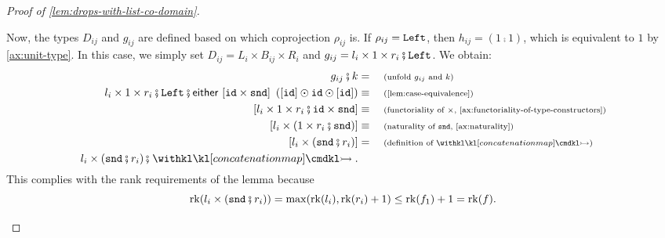 \begin{proof}[Proof of \cref{lem:drops-with-list-co-domain}]
\begin{description}
\begin{description}
			Now, the types $D_{ij}$ and $g_{ij}$ are defined based on which coprojection $\rho_{ij}$ is. If $\rho_{ij} = \mathtt{Left}$, then $h_{ij} = (1 \comp 1)$, which is equivalent to $1$ by \cref{ax:unit-type}. In this case, we simply set $D_{ij} = L_i \times B_{ij} \times R_i$ and $g_{ij} = l_i \times 1 \times r_i \comp \leftterm$. We obtain:
			\begin{align*}
				g_{i j} \comp k &= \why{unfold $g_{i j}$ and $k$} \\ 
				l_i \times 1 \times r_i \comp \leftterm \comp \either{ [\idterm \times \sndterm]}{\left( [\idterm] \odot \idterm \odot [\idterm] \right)} \equalbecause{\cref{lem:case-equivalence}} \\ 
				\left[ l_i \times 1 \times r_i \comp \idterm \times \sndterm \right] \equalbecause{functoriality of $\times$, \cref{ax:functoriality-of-type-constructors}} \\
				\left[ l_i \times \left( 1 \times r_i \comp \sndterm \right) \right] \equalbecause{naturality of $\sndterm$, \cref{ax:naturality}} \\
				\left[ l_i \times \left( \sndterm \comp r_i \right) \right] &= \why{definition of $\concmap$} \\ 
				l_i \times \left( \sndterm \comp r_i \right) \comp \concmap.
			\end{align*} 
			This complies with the rank requirements of the lemma because 
			\[ 
				\rk(l_i \times (\sndterm \comp r_i)) = \max(\rk(l_i), \rk(r_i) + 1) \leq \rk(f_1) + 1 = \rk(f).
			\]


\end{description}
\end{description}
\end{proof}
